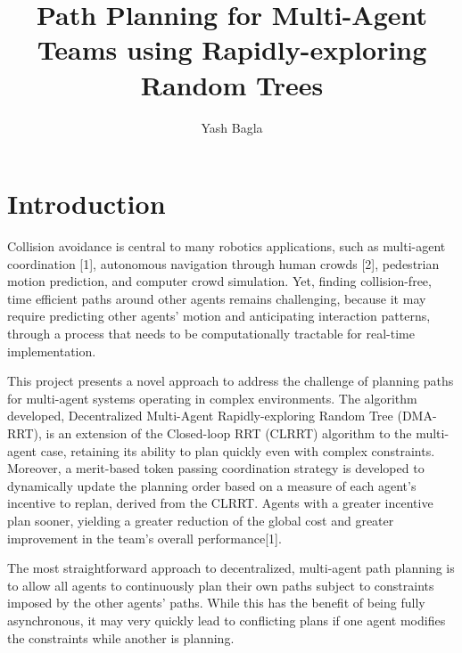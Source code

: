 \documentclass[a4paper]{article}
\title{Path Planning for Multi-Agent Teams using Rapidly-exploring Random Trees}
\author{Yash Bagla}
\begin{document}
\maketitle



\section{Introduction}
\label{sec:introduction}
Collision avoidance is central to many robotics applications, such as multi-agent coordination [1], autonomous navigation through human crowds [2], pedestrian motion prediction, and computer crowd simulation. Yet, finding collision-free, time efficient paths around other agents remains challenging, because it may require predicting other agents’ motion and anticipating interaction patterns, through a process that needs to be computationally tractable for real-time implementation.

This project presents a novel approach to address the challenge of planning paths for multi-agent systems operating in complex environments. The algorithm developed, Decentralized Multi-Agent Rapidly-exploring Random Tree (DMA-RRT), is an extension of the Closed-loop RRT (CLRRT) algorithm to the multi-agent case, retaining its ability to plan quickly even with complex constraints. Moreover, a merit-based token passing coordination strategy is developed to dynamically update the
planning order based on a measure of each agent’s incentive to replan, derived from the CLRRT. Agents with a greater incentive plan sooner, yielding a greater reduction of the global cost and greater improvement in the team’s overall performance[1].

The most straightforward approach to decentralized, multi-agent path planning is to allow all agents to continuously plan their own paths subject to constraints imposed by the other agents’ paths. While this has the benefit of being fully asynchronous, it may very quickly lead to conflicting plans if one agent modifies the constraints while another is planning.
\end{document}
